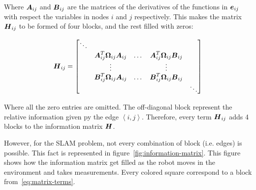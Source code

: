 Where $\boldsymbol{A}_{ij}$ and $\boldsymbol{B}_{ij}$ are the matrices of the derivatives of the functions in $\boldsymbol{e}_{ij}$ with respect the variables in nodes $i$ and $j$ respectively. This makes the matrix $\boldsymbol{H}_{ij}$ to be formed of four blocks, and the rest filled with zeros:

\begin{equation}
\boldsymbol{H}_{ij} = \begin{bmatrix}
\ddots & & & & \\
& \boldsymbol{A}_{ij}^T \boldsymbol{\Omega}_{ij}\boldsymbol{A}_{ij} & \dots & 
\boldsymbol{A}_{ij}^T \boldsymbol{\Omega}_{ij}\boldsymbol{B}_{ij} & \\
& \vdots & & \vdots & \\
& \boldsymbol{B}_{ij}^T \boldsymbol{\Omega}_{ij}\boldsymbol{A}_{ij} & \dots & 
\boldsymbol{B}_{ij}^T \boldsymbol{\Omega}_{ij}\boldsymbol{B}_{ij} & \\
& & & & \ddots
\end{bmatrix}
\label{eq:matrix-terms}
\end{equation}

Where all the zero entries are omitted. The off-diagonal block represent the relative information given py the edge $\left\langle i,j\right\rangle$. Therefore, every term $\boldsymbol{H}_{ij}$ adds 4 blocks to the information matrix $\boldsymbol{H}$.

However, for the SLAM problem, not every combination of block (i.e. edges) is possible. This fact is represented in figure~\ref{fig:information-matrix}. This figure shows how the information matrix get filled as the robot moves in the environment and takes measurements. Every colored square correspond to a block from~\eqref{eq:matrix-terms}. 


